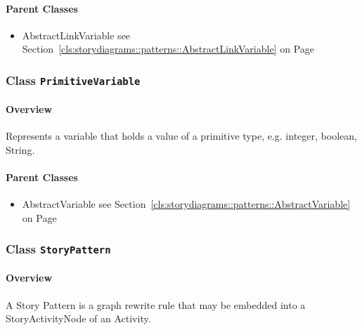 	



\paragraph{Parent Classes}
\begin{itemize}
\item AbstractLinkVariable see Section~\ref{cls:storydiagrams::patterns::AbstractLinkVariable} on Page~\pageref{cls:storydiagrams::patterns::AbstractLinkVariable}\end{itemize}
\subsubsection{\Large{Class \bfseries \texttt{PrimitiveVariable}\normalfont}}
\label{cls:storydiagrams::patterns::PrimitiveVariable} 
\paragraph{Overview}

	
			
Represents a variable that holds a value of a primitive type, e.g. integer, boolean, String.	
		
	



\paragraph{Parent Classes}
\begin{itemize}
\item AbstractVariable see Section~\ref{cls:storydiagrams::patterns::AbstractVariable} on Page~\pageref{cls:storydiagrams::patterns::AbstractVariable}\end{itemize}
\subsubsection{\Large{Class \bfseries \texttt{StoryPattern}\normalfont}}
\label{cls:storydiagrams::patterns::StoryPattern} 
\paragraph{Overview}

	
			
A Story Pattern is a graph rewrite rule that may be embedded into a StoryActivityNode
of an Activity.	
		
	


